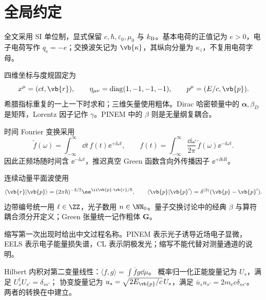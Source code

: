 \chapter*{全局约定}

全文采用 SI 单位制，显式保留 \(c,\hbar,\varepsilon_0,\mu_0\) 与 \(k_{\rm B}\)。基本电荷的正值记为 \(e>0\)，电子电荷写作 \(q_{\mathrm e}=-e\)；交换波矢记为 \(\vb{\kappa}\)，其纵向分量为 \(\kappa_z\)，不复用电荷字母。

四维坐标与度规固定为
\[
x^\mu=(ct,\vb{r}),\qquad
\eta_{\mu\nu}=\operatorname{diag}(1,-1,-1,-1),
\qquad p^\mu=(E/c,\vb{p}).
\]
希腊指标重复的一上一下时求和；三维矢量使用粗体。Dirac 哈密顿量中的 \(\boldsymbol\alpha,\beta_D\) 是矩阵，Lorentz 因子记作 \(\gamma\)。PINEM 中的 \(\beta\) 则是无量纲复耦合。

时间 Fourier 变换采用
\[
\widetilde f(\omega)=\int_{-\infty}^{\infty}\dd t\,f(t)\ee^{+\ii\omega t},
\qquad
f(t)=\int_{-\infty}^{\infty}\frac{\dd\omega}{2\pi}\,
\widetilde f(\omega)\ee^{-\ii\omega t}.
\]
因此正频场随时间含 \(\ee^{-\ii\omega t}\)，推迟真空 Green 函数含向外传播因子 \(\ee^{+\ii kR}\)。

连续动量平面波使用
\[
\langle\vb{r}|\vb{p}\rangle=(2\pi\hbar)^{-3/2}
\ee^{\ii\vb{p}\cdot\vb{r}/\hbar},
\qquad
\langle\vb{p}|\vb{p}'\rangle=\delta^{(3)}(\vb{p}-\vb{p}').
\]
边带编号统一用 \(\ell\in\ZZ\)，光子数用 \(n\in\NN_0\)。量子交换讨论中的经典 \(\beta\) 与算符耦合须分开定义；Green 张量统一记作粗体 \(\mathbf G\)。

缩写第一次出现时给出中文过程名称。PINEM 表示光子诱导近场电子显微，EELS 表示电子能量损失谱，CL 表示阴极发光；缩写不能代替对测量通道的说明。



Hilbert 内积对第二变量线性：$\langle f,g\rangle=\int\overline f g\dd\mu$。
概率归一化正能旋量记为 $U_s$，满足 $U_s^\dagger U_{s'}=\delta_{ss'}$；
协变旋量记为 $u_s=\sqrt{2E_{\vb{p}}/c}\,U_s$，满足 $\bar u_su_{s'}=2m_{\mathrm e}c\delta_{ss'}$。
两者的转换在中建立。
